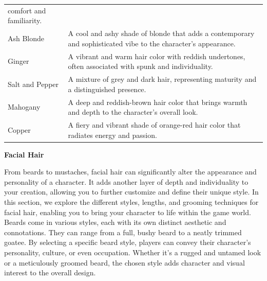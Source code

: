 \begin{longtable}[]{@{}
  >{\raggedright\arraybackslash}p{}
  >{\raggedright\arraybackslash}p{}@{}}
comfort and familiarity. \\
Ash Blonde & A cool and ashy shade of blonde that adds a contemporary
and sophisticated vibe to the character's appearance. \\
Ginger & A vibrant and warm hair color with reddish undertones, often
associated with spunk and individuality. \\
Salt and Pepper & A mixture of grey and dark hair, representing maturity
and a distinguished presence. \\
Mahogany & A deep and reddish-brown hair color that brings warmth and
depth to the character's overall look. \\
Copper & A fiery and vibrant shade of orange-red hair color that
radiates energy and passion. \\
\bottomrule
\end{longtable}

\textbf{Facial Hair}

From beards to mustaches, facial hair can significantly alter the
appearance and personality of a character. It adds another layer of
depth and individuality to your creation, allowing you to further
customize and define their unique style. In this section, we explore the
different styles, lengths, and grooming techniques for facial hair,
enabling you to bring your character to life within the game world.
Beards come in various styles, each with its own distinct aesthetic and
connotations. They can range from a full, bushy beard to a neatly
trimmed goatee. By selecting a specific beard style, players can convey
their character's personality, culture, or even occupation. Whether it's
a rugged and untamed look or a meticulously groomed beard, the chosen
style adds character and visual interest to the overall design.

